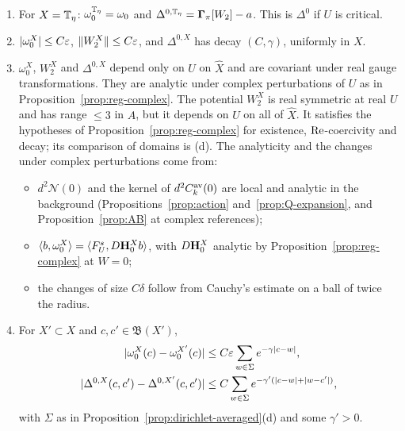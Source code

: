 \begin{proposition}\label{prop:dirichlet-hessian}
\begin{enumerate}[label=(\alph*)]
\item For $X=\mathbb T_\eta$: $\omega_0^{\mathbb T_\eta}=\omega_0$ and $\Delta^{0,\mathbb T_\eta}=\boldsymbol\Gamma_\pi[W_2]-a$. This is $\Delta^0$ if $U$ is critical.
\item $|\omega_0^X|\le C\varepsilon$, $\|W_2^X\|\le C\varepsilon$, and $\Delta^{0,X}$ has decay $(C,\gamma)$, uniformly in $X$.
\item $\omega_0^X$, $W_2^X$ and $\Delta^{0,X}$ depend only on $U$ on $\hat X$ and are covariant under real gauge transformations. They are analytic under complex perturbations of $U$ as in Proposition~\ref{prop:reg-complex}. The potential $W_2^X$ is real symmetric at real $U$ and has range $\le3$ in $A$, but it depends on $U$ on all of $\hat X$. It satisfies the hypotheses of Proposition~\ref{prop:reg-complex} for existence, $\operatorname{Re}$-coercivity and decay; its comparison of domains is (d). The analyticity and the changes under complex perturbations come from:
  \begin{itemize}
  \item $d^2\mathcal N(0)$ and the kernel of $d^2C^{\rm av}_k(0)$ are local and analytic in the background (Propositions~\ref{prop:action} and~\ref{prop:Q-expansion}, and Proposition~\ref{prop:AB} at complex references);
  \item $\langle b,\omega^X_0\rangle=\langle F^s_U,D\mathbf H^X_0b\rangle$, with $D\mathbf H^X_0$ analytic by Proposition~\ref{prop:reg-complex} at $W=0$;
  \item the changes of size $C\delta$ follow from Cauchy's estimate on a ball of twice the radius.
  \end{itemize}
\item For $X'\subset X$ and $c,c'\in\mathfrak B(X')$,
\[
\begin{aligned}
|\omega_0^X(c)-\omega_0^{X'}(c)|&\le C\varepsilon\sum_{w\in\Sigma}e^{-\gamma|c-w|},\\
|\Delta^{0,X}(c,c')-\Delta^{0,X'}(c,c')|&\le C\sum_{w\in\Sigma}e^{-\gamma'(|c-w|+|w-c'|)},
\end{aligned}
\]
with $\Sigma$ as in Proposition~\ref{prop:dirichlet-averaged}(d) and some $\gamma'>0$.
\end{enumerate}
\end{proposition}


